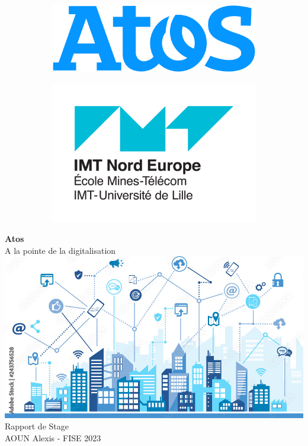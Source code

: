 \documentclass[12pt]{article}
\author {Alexis Aoun}
\begin{document}
\begin {sloppypar}
\begin{titlepage}
  \begin{figure}
  \centering
  \begin{subfigure}{.5\textwidth}
    \centering
    \includegraphics[width=.4\linewidth]{logo_atos.png}
  \end{subfigure}%
  \begin{subfigure}{.5\textwidth}
    \centering
    \includegraphics[width=.4\linewidth]{logo_imt.png}
  \end{subfigure}
  \end{figure}
  \begin{center}
    \vspace*{1cm}
    \huge
    \textbf{Atos}\\
    \vspace{0.5cm}
    \LARGE 
    A la pointe de la digitalisation
    \vspace{2cm}
    \includegraphics[width=15cm]{title.jpg} 
    \vspace{2cm}
    \normalsize
    Rapport de Stage\\
    AOUN Alexis - FISE 2023
  \end{center}
\end{titlepage}


\end{sloppypar}
\end{document}
